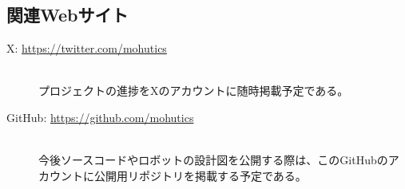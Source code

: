 \documentclass[uplatex,a4paper,12pt]{jsarticle}
\begin{document}
\subsection{関連Webサイト}
\begin{description}
  \item[X: \url{https://twitter.com/mohutics}]\mbox{}\\
  プロジェクトの進捗をXのアカウントに随時掲載予定である。
  \item[GitHub: \url{https://github.com/mohutics}]\mbox{}\\
  今後ソースコードやロボットの設計図を公開する際は、このGitHubのアカウントに公開用リポジトリを掲載する予定である。
\end{description}







\end{document}
